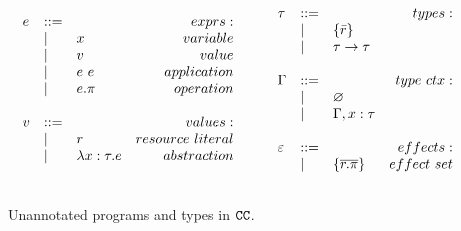 \begin{figure}
\[
\begin{array}{lll}

\begin{array}{lllr}
e & ::= & ~ & exprs: \\
	& | & x & variable \\
	& | & v & value \\
	& | & e ~ e & application \\
	& | & e.\pi & operation \\
	&&\\

v & ::= & ~ & values: \\
	& | & r & resource~literal \\
	& | & \lambda x: \tau.e & abstraction \\
	&&\\
\end{array}

\hspace{5ex}

\begin{array}{lllr}

\tau & ::= & ~ & types: \\
		& | & \{ \bar r \} \\
		& | & \tau \rightarrow \tau \\ 
		&&\\

\Gamma & ::= & ~ & type~ctx: \\
				& | & \varnothing \\
				& | & \Gamma, x: \tau \\
				&&\\
				
\varepsilon & ::= & ~ & effects: \\
		& | & \{ \overline{r.\pi} \} & effect~set \\
		&&\\

				
\end{array}

\end{array}
\]
\vspace{-0.5cm}
\caption{Unannotated programs and types in $\mathtt{CC}$.}
\vspace{-0.5cm}
\label{fig:epscalc_unannotated_grammar}
\end{figure}


